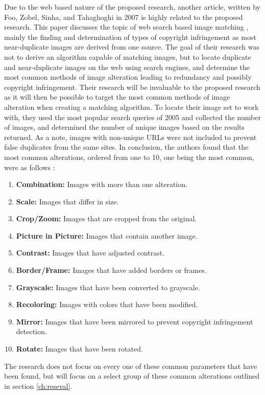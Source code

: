 Due to the web based nature of the proposed research, another article, written by Foo, Zobel, Sinha, and Tahaghoghi in 2007 is highly related to the proposed research. This paper discusses the topic of web search based image matching \cite{Foo:2007}, mainly the finding and determination of types of copyright infringement as most near-duplicate images are derived from one source. The goal of their research was not to derive an algorithm capable of matching images, but to locate duplicate and near-duplicate images on the web using search engines, and determine the most common methods of image alteration leading to redundancy and possibly copyright infringement. Their research will be invaluable to the proposed research as it will then be possible to target the most common methods of image alteration when creating a matching algorithm. To locate their image set to work with, they used the most popular search queries of 2005 and collected the number of images, and determined the number of unique images based on the results returned. As a note, images with non-unique URLs were not included to prevent false duplicates from the same sites. In conclusion, the authors found that the most common alterations, ordered from one to 10, one being the most common, were as follows \cite{Foo:2007}:
\begin{enumerate}
\item
\textbf{Combination:} Images with more than one alteration.
\item
\textbf{Scale:} Images that differ in size.
\item
\textbf{Crop/Zoom:} Images that are cropped from the original.
\item
\textbf{Picture in Picture:} Images that contain another image.
\item
\textbf{Contrast:} Images that have adjusted contrast.
\item
\textbf{Border/Frame:} Images that have added borders or frames.
\item
\textbf{Grayscale:} Images that have been converted to grayscale.
\item
\textbf{Recoloring:} Images with colors that have been modified.
\item
\textbf{Mirror:} Images that have been mirrored to prevent copyright infringement detection.
\item
\textbf{Rotate:} Images that have been rotated.
\end{enumerate}

The research does not focus on every one of these common parameters that have been found, but will focus on a select group of these common alterations outlined in section \ref{ch:reseval}.

